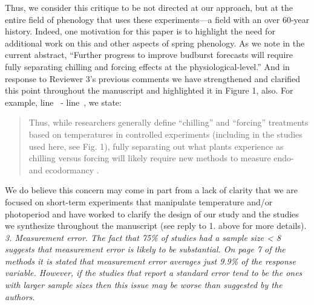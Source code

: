\documentclass{article}
\newcommand{\lr}[1]{line~\lineref{#1}}
\begin{document}
{Thus, we consider this critique to be not directed at our approach, but at the entire field of phenology that uses these experiments---a field with an over 60-year history. Indeed, one motivation for this paper is to highlight the need for additional work on this and other aspects of spring phenology. As we note in the current abstract, ``Further progress to improve budburst forecasts will require fully separating chilling and forcing effects at the physiological-level.'' And in response to Reviewer 3's previous comments we have strengthened and clarified this point throughout the manuscript and highlighted it in Figure 1, also. For example, \lr{whatchillstart} - \lr{whatchillend}, we state:
\begin{quote}
Thus, while researchers generally define ``chilling'' and ``forcing'' treatments based on temperatures in controlled experiments (including in the studies used here, see Fig. 1), fully separating out what plants experience as chilling versus forcing will likely require new methods to measure endo- and ecodormancy \emph{\citep{vanderschoot2014}}. 
\end{quote}
We do believe this concern may come in part from a lack of clarity that we are focused on short-term experiments that manipulate temperature and/or photoperiod and have worked to clarify the design of our study  and the studies we synthesize throughout the manuscript (see reply to 1. above for more details).\\

\emph{3. Measurement error. The fact that 75\% of studies had a sample size < 8 suggests that
measurement error is likely to be substantial. On page 7 of the methods it is stated that
measurement error averages just 9.9\% of the response variable. However, if the studies that
report a standard error tend to be the ones with larger sample sizes then this issue may be
worse than suggested by the authors.}\\

}
\end{document}
